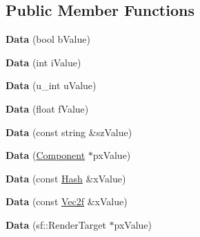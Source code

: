 \subsection*{Public Member Functions}
\begin{DoxyCompactItemize}
\item 
\hypertarget{class_k_g_e_1_1_data_a99e94ff565fe37237ab9fb5b76fbb891}{{\bfseries Data} (bool b\-Value)}\label{class_k_g_e_1_1_data_a99e94ff565fe37237ab9fb5b76fbb891}

\item 
\hypertarget{class_k_g_e_1_1_data_a7d20a85d571fc97595811caad264a617}{{\bfseries Data} (int i\-Value)}\label{class_k_g_e_1_1_data_a7d20a85d571fc97595811caad264a617}

\item 
\hypertarget{class_k_g_e_1_1_data_ac809b9857e669c63df74886c87423f7f}{{\bfseries Data} (u\-\_\-int u\-Value)}\label{class_k_g_e_1_1_data_ac809b9857e669c63df74886c87423f7f}

\item 
\hypertarget{class_k_g_e_1_1_data_a269e9cfaffcd217bc3a7aff6cdb787ac}{{\bfseries Data} (float f\-Value)}\label{class_k_g_e_1_1_data_a269e9cfaffcd217bc3a7aff6cdb787ac}

\item 
\hypertarget{class_k_g_e_1_1_data_a9615c4b192077642dfd501922a8b704e}{{\bfseries Data} (const string \&sz\-Value)}\label{class_k_g_e_1_1_data_a9615c4b192077642dfd501922a8b704e}

\item 
\hypertarget{class_k_g_e_1_1_data_a52c78fd395200fa4d65101aaec82916f}{{\bfseries Data} (\hyperlink{class_k_g_e_1_1_component}{Component} $\ast$px\-Value)}\label{class_k_g_e_1_1_data_a52c78fd395200fa4d65101aaec82916f}

\item 
\hypertarget{class_k_g_e_1_1_data_ae8634ad86f0401f84d1d15f304807dac}{{\bfseries Data} (const \hyperlink{class_k_g_e_1_1_hash}{Hash} \&x\-Value)}\label{class_k_g_e_1_1_data_ae8634ad86f0401f84d1d15f304807dac}

\item 
\hypertarget{class_k_g_e_1_1_data_a1db298fde4e4e49aa53c6ae2090883a5}{{\bfseries Data} (const \hyperlink{struct_k_g_e_1_1_vec2f}{Vec2f} \&x\-Value)}\label{class_k_g_e_1_1_data_a1db298fde4e4e49aa53c6ae2090883a5}

\item 
\hypertarget{class_k_g_e_1_1_data_a88890cc90d6eaa8f3a10f3b7b6a2b871}{{\bfseries Data} (sf\-::\-Render\-Target $\ast$px\-Value)}\label{class_k_g_e_1_1_data_a88890cc90d6eaa8f3a10f3b7b6a2b871}


\end{DoxyCompactItemize}

